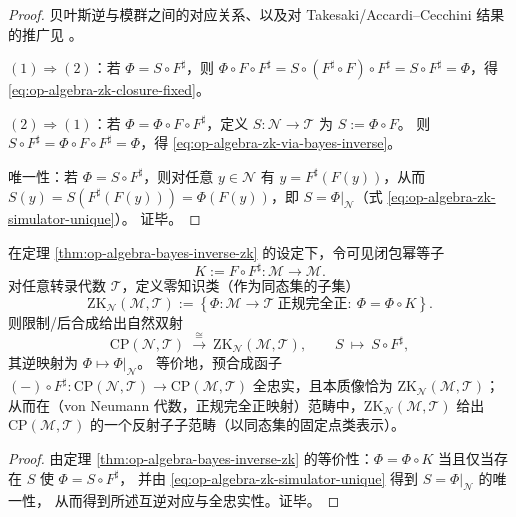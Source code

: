\begin{proof}
贝叶斯逆与模群之间的对应关系、以及对 Takesaki/Accardi--Cecchini 结果的推广见 \cite{GiorgettiEtAl2023BayesianInversionModularGroup}。
\par
\((1)\Rightarrow(2)\)：若 \(\Phi=S\circ F^\sharp\)，则
\(
\Phi\circ F\circ F^\sharp=S\circ (F^\sharp\circ F)\circ F^\sharp=S\circ F^\sharp=\Phi
\)，得 \eqref{eq:op-algebra-zk-closure-fixed}。
\par
\((2)\Rightarrow(1)\)：若 \(\Phi=\Phi\circ F\circ F^\sharp\)，定义 \(S:\mathcal{N}\to\mathcal{T}\) 为 \(S:=\Phi\circ F\)。
则
\(
S\circ F^\sharp=\Phi\circ F\circ F^\sharp=\Phi
\)，得 \eqref{eq:op-algebra-zk-via-bayes-inverse}。
\par
唯一性：若 \(\Phi=S\circ F^\sharp\)，则对任意 \(y\in\mathcal{N}\) 有 \(y=F^\sharp(F(y))\)，从而
\(
S(y)=S(F^\sharp(F(y)))=\Phi(F(y))
\)，即 \(S=\Phi|_{\mathcal{N}}\)（式 \eqref{eq:op-algebra-zk-simulator-unique}）。
证毕。
\end{proof}

\begin{corollary}[贝叶斯逆诱导的零知识信道反射子与范畴同构]\label{cor:op-algebra-zk-reflector-bayes}
在定理 \ref{thm:op-algebra-bayes-inverse-zk} 的设定下，令可见闭包幂等子
\[
K:=F\circ F^\sharp:\mathcal{M}\to\mathcal{M}.
\]
对任意转录代数 \(\mathcal{T}\)，定义零知识类（作为同态集的子集）
\[
\mathrm{ZK}_{\mathcal{N}}(\mathcal{M},\mathcal{T})
:=\left\{\Phi:\mathcal{M}\to\mathcal{T}\ \text{正规完全正}:\ \Phi=\Phi\circ K\right\}.
\]
则限制/后合成给出自然双射
\[
\mathrm{CP}(\mathcal{N},\mathcal{T})\ \xrightarrow{\ \cong\ }\ \mathrm{ZK}_{\mathcal{N}}(\mathcal{M},\mathcal{T}),
\qquad
S\ \longmapsto\ S\circ F^\sharp,
\]
其逆映射为 \(\Phi\mapsto \Phi|_{\mathcal{N}}\)。
等价地，预合成函子 \((-) \circ F^\sharp:\mathrm{CP}(\mathcal{N},\mathcal{T})\to \mathrm{CP}(\mathcal{M},\mathcal{T})\) 全忠实，且本质像恰为 \(\mathrm{ZK}_{\mathcal{N}}(\mathcal{M},\mathcal{T})\)；
从而在（von Neumann 代数，正规完全正映射）范畴中，\(\mathrm{ZK}_{\mathcal{N}}(\mathcal{M},\mathcal{T})\) 给出 \(\mathrm{CP}(\mathcal{M},\mathcal{T})\) 的一个反射子子范畴（以同态集的固定点类表示）。
\end{corollary}
\begin{proof}
由定理 \ref{thm:op-algebra-bayes-inverse-zk} 的等价性：\(\Phi=\Phi\circ K\) 当且仅当存在 \(S\) 使 \(\Phi=S\circ F^\sharp\)，
并由 \eqref{eq:op-algebra-zk-simulator-unique} 得到 \(S=\Phi|_{\mathcal{N}}\) 的唯一性，
从而得到所述互逆对应与全忠实性。证毕。
\end{proof}

